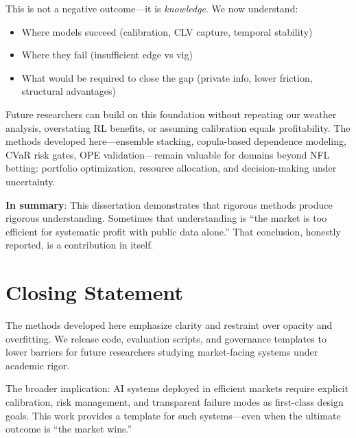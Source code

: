 This is not a negative outcome—it is \textit{knowledge}. We now understand:
\begin{itemize}
  \item Where models succeed (calibration, CLV capture, temporal stability)
  \item Where they fail (insufficient edge vs vig)
  \item What would be required to close the gap (private info, lower friction, structural advantages)
\end{itemize}

Future researchers can build on this foundation without repeating our weather analysis, overstating RL benefits, or assuming calibration equals profitability. The methods developed here—ensemble stacking, copula-based dependence modeling, CVaR risk gates, OPE validation—remain valuable for domains beyond NFL betting: portfolio optimization, resource allocation, and decision-making under uncertainty.

\vspace{1em}
\noindent \textbf{In summary}: This dissertation demonstrates that rigorous methods produce rigorous understanding. Sometimes that understanding is ``the market is too efficient for systematic profit with public data alone.'' That conclusion, honestly reported, is a contribution in itself.

\section{Closing Statement}

The methods developed here emphasize clarity and restraint over opacity and overfitting. We release code, evaluation scripts, and governance templates to lower barriers for future researchers studying market-facing systems under academic rigor.

The broader implication: AI systems deployed in efficient markets require explicit calibration, risk management, and transparent failure modes as first-class design goals. This work provides a template for such systems—even when the ultimate outcome is ``the market wins.''
